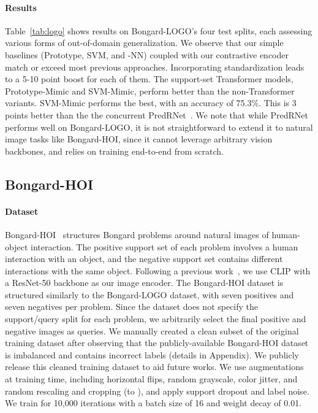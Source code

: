 \paragraph{Results} Table~\ref{tab:logo} shows results on Bongard-LOGO's four test splits, each assessing various forms of out-of-domain generalization. We observe that our simple baselines (Prototype, SVM, and -NN) coupled with our contrastive encoder match or exceed most previous approaches. Incorporating standardization leads to a 5-10 point boost for each of them. The support-set Transformer models, Prototype-Mimic and SVM-Mimic, perform better than the non-Transformer variants.
SVM-Mimic performs the best, with an accuracy of 75.3\%. This is 3 points better than the the concurrent PredRNet~\cite{yang2023neural}.
We note that while PredRNet performs well on Bongard-LOGO, it is not straightforward to extend it to natural image tasks like Bongard-HOI, since it cannot leverage arbitrary vision backbones, and relies on training end-to-end from scratch.

\subsection{Bongard-HOI}
\paragraph{Dataset}
Bongard-HOI~\cite{jiang2023bongardhoi} structures Bongard problems around natural images of human-object
interaction. The positive support set of each problem involves a human interaction with an object, and the negative support set contains different interactions with the same object. Following a previous work~\cite{shu2022testtime}, we use CLIP with a ResNet-50 backbone as our image encoder. The Bongard-HOI dataset is structured similarly to the Bongard-LOGO dataset, with seven positives and seven negatives per problem. Since the dataset does not specify the support/query split for each problem, we arbitrarily select the final positive and negative images as queries. 
We manually created a clean subset of the original training dataset after observing that the publicly-available Bongard-HOI dataset is imbalanced and contains incorrect labels (details in Appendix). We publicly release this cleaned training dataset to aid future works. We use augmentations at training time, including horizontal flips, random grayscale, color jitter, and random rescaling and cropping (to ), and apply support dropout and label noise.
We train for 10,000 iterations with a batch size of 16 and weight decay of 0.01.

